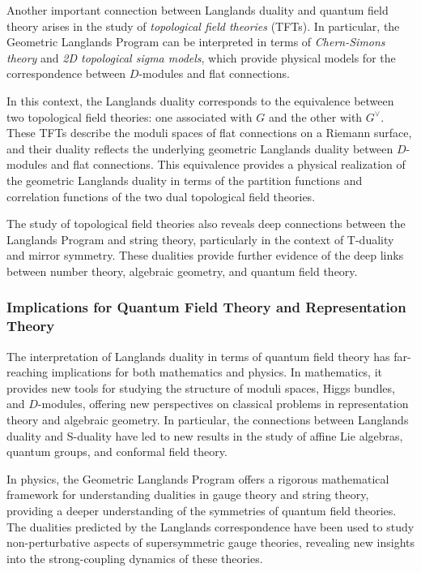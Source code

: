 \documentclass{article}
\theoremstyle{remark}
\begin{document}
Another important connection between Langlands duality and quantum field theory arises in the study of \emph{topological field theories} (TFTs). In particular, the Geometric Langlands Program can be interpreted in terms of \emph{Chern-Simons theory} and \emph{2D topological sigma models}, which provide physical models for the correspondence between $D$-modules and flat connections.

In this context, the Langlands duality corresponds to the equivalence between two topological field theories: one associated with $G$ and the other with $G^\vee$. These TFTs describe the moduli spaces of flat connections on a Riemann surface, and their duality reflects the underlying geometric Langlands duality between $D$-modules and flat connections. This equivalence provides a physical realization of the geometric Langlands duality in terms of the partition functions and correlation functions of the two dual topological field theories.

The study of topological field theories also reveals deep connections between the Langlands Program and string theory, particularly in the context of T-duality and mirror symmetry. These dualities provide further evidence of the deep links between number theory, algebraic geometry, and quantum field theory.

\subsubsection{Implications for Quantum Field Theory and Representation Theory}

The interpretation of Langlands duality in terms of quantum field theory has far-reaching implications for both mathematics and physics. In mathematics, it provides new tools for studying the structure of moduli spaces, Higgs bundles, and $D$-modules, offering new perspectives on classical problems in representation theory and algebraic geometry. In particular, the connections between Langlands duality and S-duality have led to new results in the study of affine Lie algebras, quantum groups, and conformal field theory.

In physics, the Geometric Langlands Program offers a rigorous mathematical framework for understanding dualities in gauge theory and string theory, providing a deeper understanding of the symmetries of quantum field theories. The dualities predicted by the Langlands correspondence have been used to study non-perturbative aspects of supersymmetric gauge theories, revealing new insights into the strong-coupling dynamics of these theories.
\end{document}
